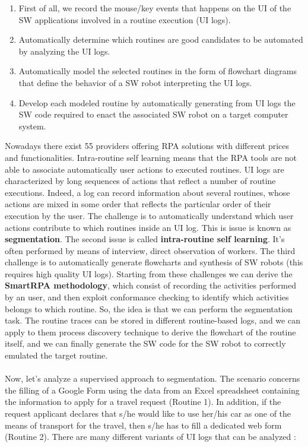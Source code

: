 \documentclass[11pt]{article}
\begin{document}
\begin{enumerate}
\item First of all, we record the mouse/key events that happens on the UI of the SW applications involved in a routine execution (UI logs).
\item Automatically determine which routines are good candidates to be automated by analyzing the UI logs.
\item Automatically model the selected routines in the form of flowchart diagrams that define the behavior of a SW robot interpreting the UI logs.
\item Develop each modeled routine by automatically generating from UI logs the SW code required to enact the associated SW robot on a target computer system.
\end{enumerate}

Nowadays there exist 55 providers offering RPA solutions with different prices and functionalities. Intra-routine self learning means that the RPA tools are not able to associate automatically user actions to executed routines. UI logs are characterized by long sequences of actions that reflect a number of routine executions. Indeed, a log can record information about several routines, whose actions are mixed in some order that reflects the particular order of their execution by the user. The challenge is to automatically understand which user actions contribute to which routines inside an UI log. This is issue is known as \textbf{segmentation}. The second issue is called \textbf{intra-routine self learning}. It's often performed by means of interview, direct observation of workers. The third challenge is to automatically generate flowcharts and synthesis of SW robots (this requires high quality UI logs). Starting from these challenges we can derive  the \textbf{SmartRPA methodology}, which consist of recording the activities performed by an user, and then exploit conformance checking to identify which activities belongs to which routine. So, the idea is that we can perform the segmentation task. The routine traces can be stored in different routine-based logs, and we can apply to them process discovery technique to derive the flowchart of the routine itself, and we can finally generate the SW code for the SW robot to correctly emulated the target routine.\\\\Now, let's analyze a supervised approach to segmentation. The scenario concerns the filling of a Google Form using the data from an Excel spreadsheet containing the information to apply for a travel request (Routine 1). In addition, if the request applicant declares that s/he would like to use her/his car as one of the means of transport for the travel, then s/he has to fill a dedicated web form (Routine 2). There are many different variants of UI logs that can be analyzed :
\end{document}

